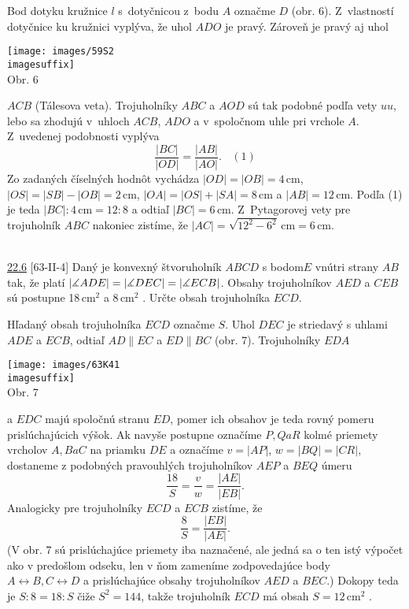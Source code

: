 \rieh Bod dotyku kružnice $l$ s~dotyčnicou z~bodu $A$ označme $D$ (obr. 6). Z~vlastností dotyčnice ku kružnici vyplýva, že uhol $ADO$ je pravý. Zároveň je pravý aj uhol
\begin{center}
\texttt{[image: images/59S2\\imagesuffix]}\\

Obr. 6
\end{center}
$ACB$ (Tálesova veta). Trojuholníky $ABC$ a $AOD$ sú tak podobné podľa vety $uu$, lebo sa zhodujú v~uhloch $ACB$, $ADO$ a v~spoločnom uhle pri vrchole $A$. Z~uvedenej podobnosti vyplýva
$$\frac{|BC|}{|OD|}=\frac{|AB|}{|AO|}. \ \ \ \  (1)$$
Zo zadaných číselných hodnôt vychádza $|OD| = |OB| = 4$\,cm, $|OS| = |SB| - |OB| = 2$\,cm, $|OA| = |OS| + |SA| = 8$\,cm a $|AB| = 12$\,cm. Podľa (1) je teda $|BC| : 4\,\text{cm} = 12 : 8$ a odtiaľ $|BC| = 6$\,cm. Z~Pytagorovej vety pre trojuholník $ABC$ nakoniec zistíme, že $|AC| = \sqrt{12^2 - 6^2}\,\text{cm}= 6$\,cm.\\
\\
\begin{tcolorbox}[breakable,notitle,boxrule=0pt,colback=light-gray,colframe=light-gray] \ul{22.6} [63-II-4]  Daný je konvexný štvoruholník $ABCD$ s bodom$E$ vnútri strany $AB$ tak, že platí $|\measuredangle ADE| = |\measuredangle DEC| = |\measuredangle ECB|$. Obsahy trojuholníkov $AED$ a $CEB$ sú postupne 18\,cm$^2$ a 8\,cm$^2$ . Určte obsah trojuholníka $ECD$.
\end{tcolorbox}

\rieh Hľadaný obsah trojuholníka $ECD$ označme $S$. Uhol $DEC$ je striedavý s uhlami $ADE$ a $ECB$, odtiaľ $AD  \parallel EC$ a $ED \parallel BC$ (obr. 7). Trojuholníky $EDA$
\begin{center}
\texttt{[image: images/63K41\\imagesuffix]}\\

Obr. 7
\end{center}
a $EDC$ majú spoločnú stranu $ED$, pomer ich obsahov je teda rovný pomeru prislúchajúcich výšok. Ak navyše postupne označíme $P, Q a R$ kolmé priemety vrcholov $A, B a C$ na priamku $DE$ a označíme $v = |AP|$, $w = |BQ| = |CR|$, dostaneme z podobných
pravouhlých trojuholníkov $AEP$ a $BEQ$ úmeru
$$\frac{18}{S}=\frac{v}{w}=\frac{|AE|}{|EB|}.$$
Analogicky pre trojuholníky $ECD$ a $ECB$ zistíme, že
$$\frac{8}{S}=\frac{|EB|}{|AE|}.$$
(V obr. 7 sú prislúchajúce priemety iba naznačené, ale jedná sa o ten istý výpočet
ako v predošlom odseku, len v ňom zameníme zodpovedajúce body $A\leftrightarrow B, C \leftrightarrow D$ a prislúchajúce obsahy trojuholníkov $AED$ a $BEC$.) Dokopy teda je $S : 8 = 18 : S$ čiže $S^2 = 144$, takže trojuholník $ECD$ má obsah $S = 12$\,cm$^2$ .





